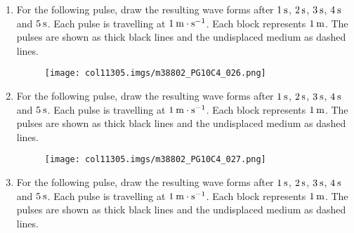 \begin{enumerate}[noitemsep, label=\textbf{\arabic*}. ]
\begin{figure}[H]
\begin{center}
    \vspace{.1in}
    \end{center}
 \end{figure}               \label{m38802*uid58}\item For the following pulse, draw the resulting wave forms after $1\phantom{\rule{2pt}{0ex}}\mathrm{s}$, $2\phantom{\rule{2pt}{0ex}}\mathrm{s}$, $3\phantom{\rule{2pt}{0ex}}\mathrm{s}$, $4\phantom{\rule{2pt}{0ex}}\mathrm{s}$ and $5\phantom{\rule{2pt}{0ex}}\mathrm{s}$. Each pulse is travelling at $1\phantom{\rule{2pt}{0ex}}\mathrm{m}\ensuremath{\cdot}\mathrm{s}{}^{-1}$. Each block represents $1\phantom{\rule{2pt}{0ex}}\mathrm{m}$. The pulses are shown as thick black lines and the undisplaced medium as dashed lines.
    \setcounter{subfigure}{0}
	\begin{figure}[H] %
    \begin{center}
    \label{m38802*id316495!!!underscore!!!media}\label{m38802*id316495!!!underscore!!!printimage}\texttt{[image: col11305.imgs/m38802\_PG10C4\_026.png]} %
      \vspace{2pt}
    \vspace{.1in}
    \end{center}
 \end{figure}               \label{m38802*uid59}\item For the following pulse, draw the resulting wave forms after $1\phantom{\rule{2pt}{0ex}}\mathrm{s}$, $2\phantom{\rule{2pt}{0ex}}\mathrm{s}$, $3\phantom{\rule{2pt}{0ex}}\mathrm{s}$, $4\phantom{\rule{2pt}{0ex}}\mathrm{s}$ and $5\phantom{\rule{2pt}{0ex}}\mathrm{s}$. Each pulse is travelling at $1\phantom{\rule{2pt}{0ex}}\mathrm{m}\ensuremath{\cdot}\mathrm{s}{}^{-1}$. Each block represents $1\phantom{\rule{2pt}{0ex}}\mathrm{m}$. The pulses are shown as thick black lines and the undisplaced medium as dashed lines.
    \setcounter{subfigure}{0}
	\begin{figure}[H] %
    \begin{center}
    \label{m38802*id316512!!!underscore!!!media}\label{m38802*id316512!!!underscore!!!printimage}\texttt{[image: col11305.imgs/m38802\_PG10C4\_027.png]} %
      \vspace{2pt}
    \vspace{.1in}
    \end{center}
 \end{figure}               \label{m38802*uid60}\item For the following pulse, draw the resulting wave forms after $1\phantom{\rule{2pt}{0ex}}\mathrm{s}$, $2\phantom{\rule{2pt}{0ex}}\mathrm{s}$, $3\phantom{\rule{2pt}{0ex}}\mathrm{s}$, $4\phantom{\rule{2pt}{0ex}}\mathrm{s}$ and $5\phantom{\rule{2pt}{0ex}}\mathrm{s}$. Each pulse is travelling at $1\phantom{\rule{2pt}{0ex}}\mathrm{m}\ensuremath{\cdot}\mathrm{s}{}^{-1}$. Each block represents $1\phantom{\rule{2pt}{0ex}}\mathrm{m}$. The pulses are shown as thick black lines and the undisplaced medium as dashed lines.

\end{enumerate}
